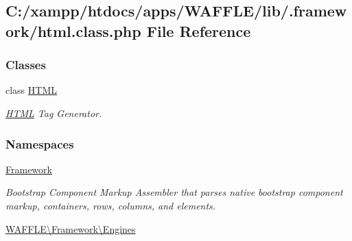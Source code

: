 \hypertarget{html_8class_8php}{}\subsection{C\+:/xampp/htdocs/apps/\+W\+A\+F\+F\+L\+E/lib/.framework/html.class.\+php File Reference}
\label{html_8class_8php}
\subsubsection*{Classes}
\begin{DoxyCompactItemize}
\item 
class \hyperlink{class_w_a_f_f_l_e_1_1_framework_1_1_engines_1_1_h_t_m_l}{H\+T\+ML}
\begin{DoxyCompactList}\small\item\em \hyperlink{class_w_a_f_f_l_e_1_1_framework_1_1_engines_1_1_h_t_m_l}{H\+T\+ML} Tag Generator. \end{DoxyCompactList}\end{DoxyCompactItemize}
\subsubsection*{Namespaces}
\begin{DoxyCompactItemize}
\item 
 \hyperlink{namespace_framework}{Framework}
\begin{DoxyCompactList}\small\item\em Bootstrap Component Markup Assembler that parses native bootstrap component markup, containers, rows, columns, and elements. \end{DoxyCompactList}\item 
 \hyperlink{namespace_w_a_f_f_l_e_1_1_framework_1_1_engines}{W\+A\+F\+F\+L\+E\textbackslash{}\+Framework\textbackslash{}\+Engines}
\end{DoxyCompactItemize}

